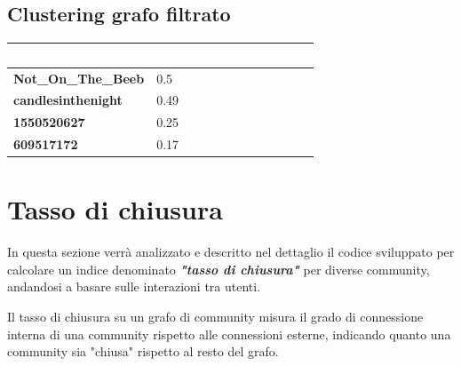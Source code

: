 \documentclass[12pt]{article}
\begin{document}
	\subsection{Clustering grafo filtrato}
	\begin{table}[H]
		\centering
		\begin{tabular}{|p{5cm}|p{5cm}|p{4cm}|}
			\hline
			\cellcolor{darkblue}\textcolor{white}{\textbf{Source}} & 
			\cellcolor{darkblue}\textcolor{white}{\textbf{Clustering\_coefficient}} \\
			\hline
			\textbf{Not\_On\_The\_Beeb} & 0.5 \\
			\hline
			\textbf{candlesinthenight} & 0.49\\
			\hline
			\textbf{1550520627} & 0.25\\
			\hline
			\textbf{609517172} & 0.17 \\
			\hline
		\end{tabular}
	\end{table}
	\newpage
	\section{Tasso di chiusura}
	In questa sezione verrà analizzato e descritto nel dettaglio il codice sviluppato per calcolare un indice denominato \textit{\textbf{"tasso di chiusura"}} per diverse community, andandosi a basare sulle interazioni tra utenti.
	\begin{boxH}
		Il tasso di chiusura su un grafo di community misura il grado di connessione interna di una community rispetto alle connessioni esterne, indicando quanto una community sia "chiusa" rispetto al resto del grafo.
	\end{boxH}
\end{document}
